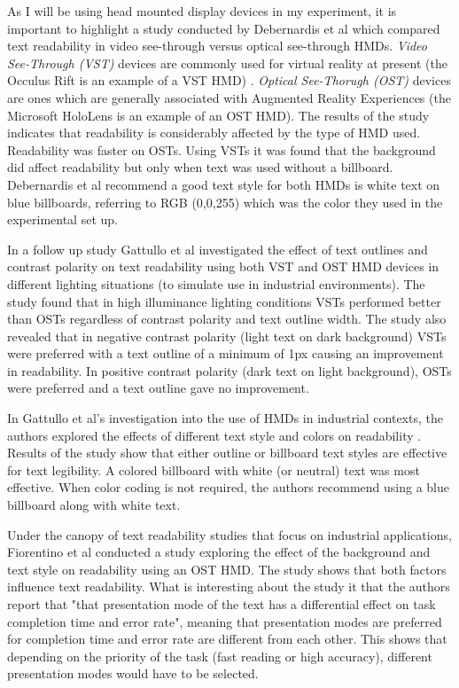 \documentclass{article}
\begin{document}
As I will be using head mounted display devices in my experiment, it is important to highlight a study conducted by Debernardis et al \cite{Debernardis6520861} which compared text readability in video see-through versus optical see-through HMDs. \textit{Video See-Through (VST)} devices are commonly used for virtual reality at present (the Occulus Rift is an example of a VST HMD) . \textit{Optical See-Thorugh (OST)} devices are ones which are generally associated with Augmented Reality Experiences (the Microsoft HoloLens is an example of an OST HMD). The results of the study indicates that readability is considerably affected by the type of HMD used. Readability was faster on OSTs. Using VSTs it was found that the background did affect readability but only when text was used without a billboard. Debernardis et al recommend a good text style for both HMDs is white text on blue billboards, referring to RGB (0,0,255) which was the color they used in the experimental set up. 

In a follow up study Gattullo et al  \cite{Gattullo6994851} investigated the effect of text outlines and contrast polarity on text readability using both VST and OST HMD devices in different lighting situations (to simulate use in industrial environments). The study found that in high illuminance lighting conditions VSTs performed better than OSTs regardless of contrast polarity and text outline width. The study also revealed that in negative contrast polarity (light text on dark background) VSTs were preferred with a text outline of a minimum of 1px causing an improvement in readability. In positive contrast polarity (dark text on light background), OSTs were preferred and a text outline gave no improvement. 

In Gattullo et al's investigation into the use of HMDs in industrial contexts, the authors explored the effects of different text style and colors on readability \cite{Gattullo7064667}. Results of the study show that either outline or billboard text styles are effective for text legibility. A colored billboard with white (or neutral) text was most effective. When color coding is not required, the authors recommend using a blue billboard along with white text. 

Under the canopy of text readability studies that focus on industrial applications, Fiorentino et al \cite{fiorentino2013augmented} conducted a study exploring the effect of the background and text style on readability using an OST HMD.  The study shows that both factors influence text readability. What is interesting about the study it that the authors report that "that presentation mode of the text has a differential effect on task completion time and error rate", meaning that presentation modes are preferred for completion time and error rate are different from each other. This shows that depending on the priority of the task (fast reading or high accuracy), different presentation modes would have to be selected. 
\end{document}
